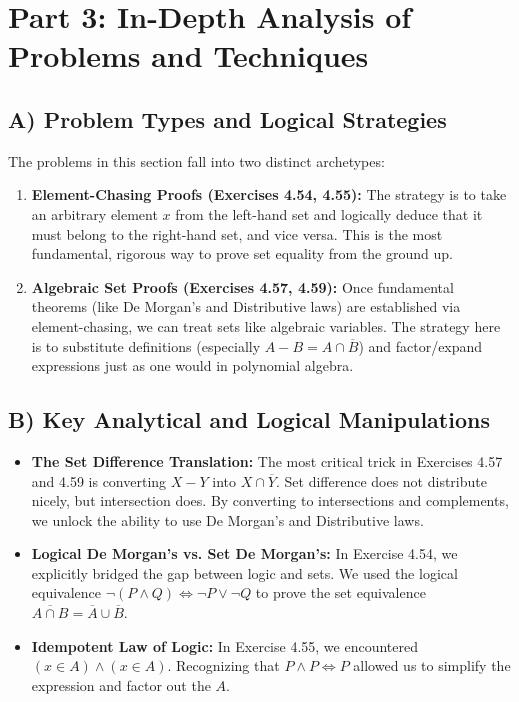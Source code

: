 \documentclass[11pt, a4paper]{article}
\theoremstyle{definition}
\theoremstyle{remark}
\begin{document}
\section{Part 3: In-Depth Analysis of Problems and Techniques}

\subsection{A) Problem Types and Logical Strategies}
The problems in this section fall into two distinct archetypes:
\begin{enumerate}
    \item \textbf{Element-Chasing Proofs (Exercises 4.54, 4.55):} The strategy is to take an arbitrary element $x$ from the left-hand set and logically deduce that it must belong to the right-hand set, and vice versa. This is the most fundamental, rigorous way to prove set equality from the ground up.
    \item \textbf{Algebraic Set Proofs (Exercises 4.57, 4.59):} Once fundamental theorems (like De Morgan's and Distributive laws) are established via element-chasing, we can treat sets like algebraic variables. The strategy here is to substitute definitions (especially $A - B = A \cap \overline{B}$) and factor/expand expressions just as one would in polynomial algebra.
\end{enumerate}

\subsection{B) Key Analytical and Logical Manipulations}
\begin{itemize}
    \item \textbf{The Set Difference Translation:} The most critical trick in Exercises 4.57 and 4.59 is converting $X - Y$ into $X \cap \overline{Y}$. Set difference does not distribute nicely, but intersection does. By converting to intersections and complements, we unlock the ability to use De Morgan's and Distributive laws.
    \item \textbf{Logical De Morgan's vs. Set De Morgan's:} In Exercise 4.54, we explicitly bridged the gap between logic and sets. We used the logical equivalence $\neg(P \land Q) \iff \neg P \lor \neg Q$ to prove the set equivalence $\overline{A \cap B} = \overline{A} \cup \overline{B}$. 
    \item \textbf{Idempotent Law of Logic:} In Exercise 4.55, we encountered $(x \in A) \land (x \in A)$. Recognizing that $P \land P \iff P$ allowed us to simplify the expression and factor out the $A$.
\end{itemize}
\end{document}
